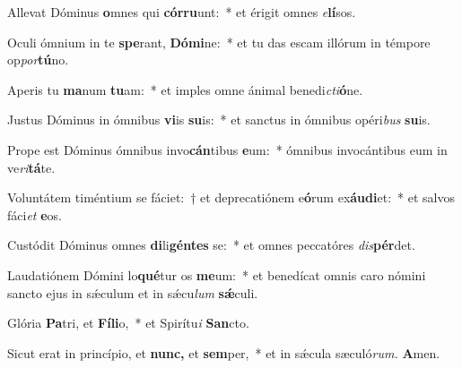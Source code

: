 \item Allevat Dóminus \textbf{o}mnes qui \textbf{cór}\textbf{ru}unt:~* et érigit omnes \textit{e}\textbf{lí}sos.
\item Oculi ómnium in te \textbf{spe}rant, \textbf{Dó}\textbf{mi}ne:~* et tu das escam illórum in témpore op\textit{por}\textbf{tú}no.
\item Aperis tu \textbf{ma}num \textbf{tu}am:~* et imples omne ánimal benedi\tinyhspace\textit{cti}\textbf{ó}ne.
\item Justus Dóminus in ómnibus \textbf{vi}is \textbf{su}is:~* et sanctus in ómnibus opéri\textit{bus} \textbf{su}is.
\item Prope est Dóminus ómnibus invo\textbf{cán}tibus \textbf{e}um:~* ómnibus invocántibus eum in ve\tinyhspace\textit{ri}\textbf{tá}te.
\item Voluntátem timéntium se fáciet:~† et deprecatiónem e\textbf{ó}rum ex\textbf{áu}\textbf{di}et:~* et salvos fáci\tinyhspace\textit{et} \textbf{e}os.
\item Custódit Dóminus omnes \textbf{di}li\textbf{gén}\textbf{tes} se:~* et omnes peccatóres \textit{dis}\textbf{pér}det.
\item Laudatiónem Dómini lo\textbf{qué}tur os \textbf{me}um:~* et benedícat omnis caro nómini sancto ejus in sǽculum et in sǽcu\tinyhspace\textit{lum} \textbf{sǽ}culi.
\item Glória \textbf{Pa}tri, et \textbf{Fí}\textbf{li}o,~* et Spirítu\textit{i} \textbf{San}cto.
\item Sicut erat in princípio, et \textbf{nunc,} et \textbf{sem}per,~* et in sǽcula sæculó\textit{rum.} \textbf{A}men.